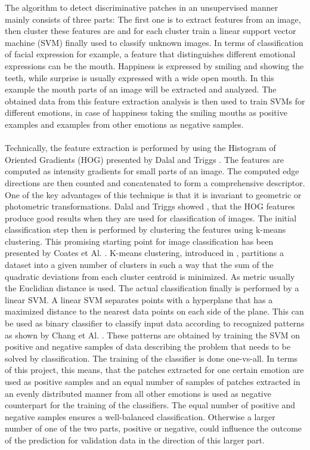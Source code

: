 The algorithm to detect discriminative patches in an unsupervised manner mainly consists of three parts: The first one is to extract features from an image, then cluster these features are  and for each cluster train a linear support vector machine (SVM) finally used to classify unknown images. In terms of classification of facial expression for example, a feature that distinguishes different emotional expressions can be the mouth. Happiness is expressed by smiling and showing the teeth, while surprise is usually expressed with a wide open mouth. In this example the mouth parts of an image will be extracted and analyzed. The obtained data from this feature extraction analysis is then used to train SVMs for different emotions, in case of happiness taking the smiling mouths as positive examples and examples from other emotions as negative samples.
\\
\\
Technically, the feature extraction is performed by using the Histogram of Oriented Gradients (HOG) presented by Dalal and Triggs \cite{Dalal:2005:HOG:1068507.1069007}. The features are computed as intensity gradients for small parts of an image. The computed edge directions are then counted and concatenated to form a comprehensive descriptor. One of the key advantages of this technique is that it is invariant to geometric or photometric transformations. Dalal and Triggs showed \cite{Dalal:2005:HOG:1068507.1069007}, that the HOG features produce good results when they are used for classification of images. The initial classification step then is performed by clustering the features using k-means clustering. This promising starting point for image classification has been presented by Coates et Al. \cite{DBLP:series/lncs/CoatesN12}. K-means clustering, introduced in \cite{macqueen1967}, partitions a dataset into a given number of clusters in such a way that the sum of the quadratic deviations from each cluster centroid is minimized. As metric usually the Euclidian distance is used. The actual classification finally is performed by a linear SVM. A linear SVM separates points with a hyperplane that has a maximized distance to the nearest data points on each side of the plane. This can be used as binary classifier to classify input data according to recognized patterns as shown by Chang et Al. \cite{Chang:2011:LLS:1961189.1961199}. These patterns are obtained by training the SVM on positive and negative samples of data describing the problem that needs to be solved by classification. The training of the classifier is done one-vs-all. In terms of this project, this means, that the patches extracted for one certain emotion are used as positive samples and an equal number of samples of patches extracted in an evenly distributed manner from all other emotions is used as negative counterpart for the training of the classifiers. The equal number of positive and negative samples ensures a well-balanced classification. Otherwise a larger number of one of the two parts, positive or negative, could influence the outcome of the prediction for validation data in the direction of this larger part.


